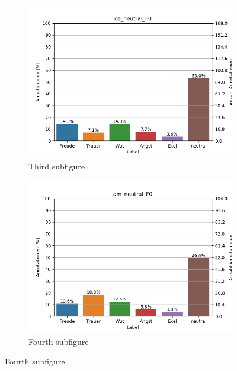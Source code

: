 \documentclass[11pt,a4paper,headsepline,twoside,toc=bibliography]{scrreprt}
\begin{document}
\begin{figure}[t!]
	\medskip
	\begin{subfigure}{0.48\textwidth}
		\includegraphics[width=\linewidth]{plots/de_neutral_F0.png}
		\caption{Third subfigure} \label{fig:de_s_F0}
	\end{subfigure}\hspace*{\fill}
	\begin{subfigure}{0.48\textwidth}
		\includegraphics[width=\linewidth]{plots/am_neutral_F0.png}
		\caption{Fourth subfigure} \label{fig:am_s_F0}
	\end{subfigure}
	

\end{figure}
\end{document}
